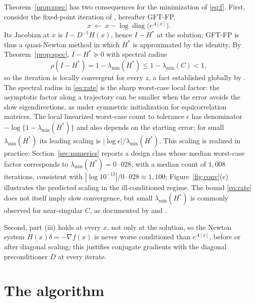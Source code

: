 \documentclass[11pt]{article}
\newcommand{\diag}{\operatorname{diag}}
\begin{document}
Theorem~\ref{prop:spec} has two consequences for the minimization of
\eqref{eq:f}. First, consider the fixed-point iteration of
\citet{ArchakovHansen:Correlation}, hereafter GFT-FP,
\begin{equation}\label{eq:fp}
x\ \leftarrow\ x-\log\diag\big(e^{A[x]}\big).
\end{equation}
Its Jacobian at $x$ is $I-D^{-1}H(x)$, hence $I-H^{\ast}$ at the
solution; GFT-FP is thus a quasi-Newton method in which $H^{\ast}$ is
approximated by the identity. By
Theorem~\ref{prop:spec}, $I-H^{\ast}\succeq0$ with spectral radius
\begin{equation}\label{eq:rate}
\rho(I-H^{\ast})=1-\lambda_{\min}(H^{\ast})\leq1-\lambda_{\min}(C)<1 ,
\end{equation}
so the iteration is locally convergent for every $z$, a fact established
globally by \citet{ArchakovHansen:Correlation}. The spectral radius in
\eqref{eq:rate} is the sharp worst-case local factor: the asymptotic
factor along a trajectory can be smaller when the error avoids the slow
eigendirections, as under symmetric initialization for equicorrelation
matrices. The local linearized worst-case count to
tolerance $\epsilon$ has denominator
$-\log\{1-\lambda_{\min}(H^{\ast})\}$ and also depends on the
starting error; for small $\lambda_{\min}(H^{\ast})$ its leading
scaling is $|\log\epsilon|/\lambda_{\min}(H^{\ast})$. This scaling is
realized in practice: Section~\ref{sec:numerics} reports a design class
whose median worst-case factor corresponds to
$\lambda_{\min}(H^{\ast})=0{\cdot}028$, with a median count of
$1{,}008$ iterations, consistent with
$|\log10^{-13}|/0{\cdot}028\approx1{,}100$; Figure~\ref{fig:conv}(c)
illustrates the predicted scaling in the ill-conditioned regime. The bound \eqref{eq:rate} does not itself imply slow convergence, but
small $\lambda_{\min}(H^{\ast})$ is commonly observed for
near-singular $C$, as documented by \citet{ArchakovHansen:Correlation}
and \citet{ChenFeiYu:2025}.

Second, part (iii) holds at every $x$, not only at the solution, so
the Newton system $H(x)\delta=-\nabla f(x)$ is never worse conditioned
than $e^{A[x]}$, before or after diagonal scaling; this justifies
conjugate gradients with the diagonal preconditioner $D$ at every
iterate.

\section{The algorithm}\label{sec:algorithm}
\end{document}
